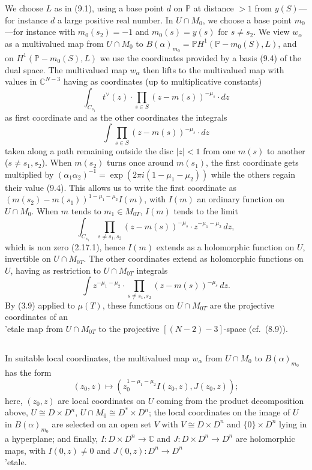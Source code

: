 \documentclass[12pt,a4paper]{article}
\theoremstyle{plain}
\theoremstyle{definition}
\theoremstyle{remark}
\newcommand{\CC}{\mathbb{C}}
\newcommand{\PP}{\mathbb{P}}
\numberwithin{equation}{section}
\providecommand{\CC}{\mathbb{C}}
\providecommand{\PP}{\mathbb{P}}
\begin{document}
We choose $L$ as in (9.1), using a base point $d$ on $\PP$ at distance $> 1$ from $y(S)$---for instance $d$ a large positive real number. In $U \cap M_0$, we choose a base point $m_0$---for instance with $m_0(s_2) = -1$ and $m_0(s) = y(s)$ for $s \neq s_2$. We view $w_\alpha$ as a multivalued map from $U \cap M_0$ to $B(\alpha)_{m_0} = \PP H^1(\PP - m_0(S), L)$, and on $H^1(\PP - m_0(S), L)$ we use the coordinates provided by a basis (9.4) of the dual space. The multivalued map $w_\alpha$ then lifts to the multivalued map with values in $\CC^{N-3}$ having as coordinates (up to multiplicative constants)
\[
\int_{C_{s_1}} t^\vee(z) \cdot \prod_{s \in S} (z - m(s))^{-\mu_s} \cdot dz
\]
as first coordinate and as the other coordinates the integrals
\[
\int \prod_{s \in S} (z - m(s))^{-\mu_s} \cdot dz
\]
taken along a path remaining outside the disc $|z| < 1$ from one $m(s)$ to another ($s \neq s_1, s_2$). When $m(s_2)$ turns once around $m(s_1)$, the first coordinate gets multiplied by $(\alpha_1 \alpha_2)^{-1} = \exp(2\pi i (1 - \mu_1 - \mu_2))$ while the others regain their value (9.4). This allows us to write the first coordinate as $(m(s_2) - m(s_1))^{1 - \mu_1 - \mu_2} I(m)$, with $I(m)$ an ordinary function on $U \cap M_0$. When $m$ tends to $m_1 \in M_{0T}$, $I(m)$ tends to the limit
\[
\int_{C_{s_1}} \prod_{s \neq s_1, s_2} (z - m(s))^{-\mu_s} \cdot z^{-\mu_1 - \mu_2} \, dz,
\]
which is non zero (2.17.1), hence $I(m)$ extends as a holomorphic function on $U$, invertible on $U \cap M_{0T}$. The other coordinates extend as holomorphic functions on $U$, having as restriction to $U \cap M_{0T}$ integrals
\[
\int z^{-\mu_1 - \mu_2} \cdot \prod_{s \neq s_1, s_2} (z - m(s))^{-\mu_s} \, dz.
\]
By (3.9) applied to $\mu(T)$, these functions on $U \cap M_{0T}$ are the projective coordinates of an \\'etale map from $U \cap M_{0T}$ to the projective $[(N - 2) - 3]$-space (cf.\ (8.9)).

\subsection{}
In suitable local coordinates, the multivalued map $w_\alpha$ from $U \cap M_0$ to $B(\alpha)_{m_0}$ has the form
\[
(z_0, z) \mapsto (z_0^{1 - \mu_1 - \mu_2} I(z_0, z), J(z_0, z));
\]
here, $(z_0, z)$ are local coordinates on $U$ coming from the product decomposition above, $U \cong D \times D^n$, $U \cap M_0 \cong D^* \times D^n$; the local coordinates on the image of $U$ in $B(\alpha)_{m_0}$ are selected on an open set $V$ with $V \cong D \times D^n$ and $\{0\} \times D^n$ lying in a hyperplane; and finally, $I: D \times D^n \to \CC$ and $J: D \times D^n \to D^n$ are holomorphic maps, with $I(0, z) \neq 0$ and $J(0, z): D^n \to D^n$ \\'etale.
\end{document}
